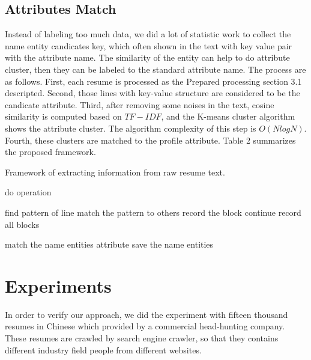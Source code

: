 \documentclass{acm_proc_article-sp}
\begin{document}
\subsection{Attributes Match}

Instead of labeling too much data, we did a lot of statistic work to collect the name entity candicates key, which often shown in the text with key value pair with the attribute name.
The similarity of the entity can help to do attribute cluster, then they can be labeled to the standard attribute name.
The process are as follows.
First, each resume is processed as the Prepared processing section 3.1 descripted.
Second, those lines with key-value structure are considered to be the candicate attribute.
Third, after removing some noises in the text, cosine similarity is computed based on $TF-IDF$, and the K-means cluster algorithm shows the attribute cluster.
The algorithm complexity of this step is $O(NlogN)$.
Fourth, these clusters are matched to the profile attribute.
Table 2 summarizes the proposed framework.

\begin{algorithm}[h] 

    \caption{Framework of extracting information from raw resume text.} 

    \begin{algorithmic}[1] 

				\STATE do operation
			\ENDIF
         \ENDFOR 

			\STATE find pattern of line
			\STATE match the pattern to others
				\STATE record the block
			\ELSE
				\STATE continue
			\ENDIF
         \ENDFOR 
		\STATE record all blocks

			\STATE match the name entities attribute
				\STATE save the name entities
			\ENDIF
         \ENDFOR 
                    

    \end{algorithmic}

\end{algorithm} 



\section{Experiments}\label{experiments}


In order to verify our approach, we did the experiment with fifteen thousand resumes in Chinese which provided by a commercial head-hunting company. 
These resumes are crawled by search engine crawler, so that they contains different industry field people from different websites.
\end{document}
